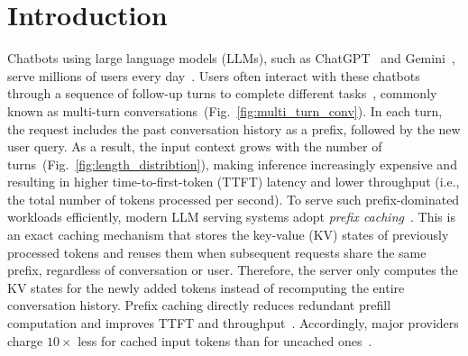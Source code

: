 \documentclass{article}
\newcommand{\jiny}[1]{\textcolor{orange}{[Jiny: #1]}}
\newcommand{\hasan}[1]{\textcolor{blue}{[Hasan: #1]}}
\begin{document}


\section{Introduction}


Chatbots using large language models (LLMs), such as ChatGPT~\cite{chatgpt2026} and Gemini~\cite{gemini2026}, serve millions of users every day~\cite{chatterji2025people}. Users often interact with these chatbots through a sequence of follow-up turns to complete different tasks~\cite{wen2025clicks}, commonly known as multi-turn conversations~(Fig.~\ref{fig:multi_turn_conv}). In each turn, the request includes the past conversation history as a prefix, followed by the new user query. As a result, the input context grows with the number of turns~(Fig.~\ref{fig:length_distribtion}), making inference increasingly expensive and resulting in higher time-to-first-token (TTFT) latency and lower throughput (i.e., the total number of tokens processed per second). To serve such prefix-dominated workloads efficiently, modern LLM serving systems adopt \emph{prefix caching}~\cite{MLSYS2024_a66caa17,10.5555/3691992.3691999,openai_prompt_cache}. This is an exact caching mechanism that stores the key-value (KV) states of previously processed tokens and reuses them when subsequent requests share the same prefix, regardless of conversation or user. Therefore, the server only computes the KV states for the newly added tokens instead of recomputing the entire conversation history. Prefix caching directly reduces redundant prefill computation and improves TTFT and throughput~\cite{MLSYS2024_a66caa17,298501}. Accordingly, major providers charge \(10\times\) less for cached input tokens than for uncached ones~\cite{anthropic_pricing,openai_pricing}.


\end{document}
